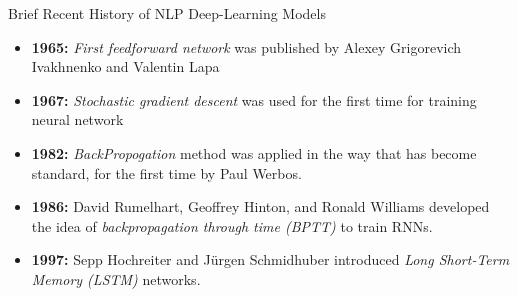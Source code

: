 \documentclass[10pt]{beamer}
\begin{document}
%
%

\begin{frame}[fragile]{Brief Recent History of NLP Deep-Learning Models}
	\begin{itemize}

		\item \textbf{1965:} \textit{First feedforward network} was published by Alexey Grigorevich Ivakhnenko and Valentin Lapa

		\item \textbf{1967:} \textit{Stochastic gradient descent} was used for the first time for training neural network

		\item \textbf{1982:} \textit{BackPropogation} method was applied in the way that has become standard, for the first time by Paul Werbos.

		\item \textbf{1986:} David Rumelhart, Geoffrey Hinton, and Ronald Williams developed the idea of
		      \textit{backpropagation through time (BPTT)} to train RNNs.


		\item \textbf{1997:} Sepp Hochreiter and Jürgen Schmidhuber introduced \textit{Long Short-Term Memory (LSTM)} networks.

	\end{itemize}
\end{frame}
\end{document}
